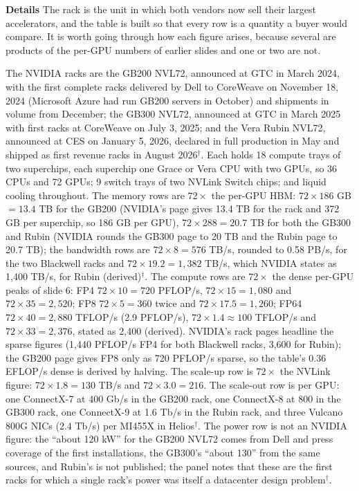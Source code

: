 \documentclass[11pt,letterpaper]{article}
\newcommand{\para}[1]{\medskip\noindent\textbf{#1}\quad}
\begin{document}
\para{Details} The rack is the unit in which both vendors now sell their largest accelerators, and the table is built so that every row is a quantity a buyer would compare. It is worth going through how each figure arises, because several are products of the per-GPU numbers of earlier slides and one or two are not.

The NVIDIA racks are the GB200 NVL72, announced at GTC in March 2024, with the first complete racks delivered by Dell to CoreWeave on November 18, 2024 (Microsoft Azure had run GB200 servers in October) and shipments in volume from December; the GB300 NVL72, announced at GTC in March 2025 with first racks at CoreWeave on July 3, 2025; and the Vera Rubin NVL72, announced at CES on January 5, 2026, declared in full production in May and shipped as first revenue racks in August 2026$^\dagger$. Each holds 18 compute trays of two superchips, each superchip one Grace or Vera CPU with two GPUs, so 36 CPUs and 72 GPUs; 9 switch trays of two NVLink Switch chips; and liquid cooling throughout. The memory rows are $72\times$ the per-GPU HBM: $72 \times 186$ GB $= 13.4$ TB for the GB200 (NVIDIA's page gives 13.4 TB for the rack and 372 GB per superchip, so 186 GB per GPU), $72 \times 288 = 20.7$ TB for both the GB300 and Rubin (NVIDIA rounds the GB300 page to 20 TB and the Rubin page to 20.7 TB); the bandwidth rows are $72 \times 8 = 576$ TB/s, rounded to 0.58 PB/s, for the two Blackwell racks and $72 \times 19.2 = 1{,}382$ TB/s, which NVIDIA states as 1{,}400 TB/s, for Rubin (derived)$^\dagger$. The compute rows are $72\times$ the dense per-GPU peaks of slide 6: FP4 $72 \times 10 = 720$ PFLOP/s, $72 \times 15 = 1{,}080$ and $72 \times 35 = 2{,}520$; FP8 $72 \times 5 = 360$ twice and $72 \times 17.5 = 1{,}260$; FP64 $72 \times 40 = 2{,}880$ TFLOP/s (2.9 PFLOP/s), $72 \times 1.4 \approx 100$ TFLOP/s and $72 \times 33 = 2{,}376$, stated as 2{,}400 (derived). NVIDIA's rack pages headline the sparse figures (1{,}440 PFLOP/s FP4 for both Blackwell racks, 3{,}600 for Rubin); the GB200 page gives FP8 only as 720 PFLOP/s sparse, so the table's 0.36 EFLOP/s dense is derived by halving. The scale-up row is $72\times$ the NVLink figure: $72 \times 1.8 = 130$ TB/s and $72 \times 3.0 = 216$. The scale-out row is per GPU: one ConnectX-7 at 400 Gb/s in the GB200 rack, one ConnectX-8 at 800 in the GB300 rack, one ConnectX-9 at 1.6 Tb/s in the Rubin rack, and three Vulcano 800G NICs (2.4 Tb/s) per MI455X in Helios$^\dagger$. The power row is not an NVIDIA figure: the ``about 120 kW'' for the GB200 NVL72 comes from Dell and press coverage of the first installations, the GB300's ``about 130'' from the same sources, and Rubin's is not published; the panel notes that these are the first racks for which a single rack's power was itself a datacenter design problem$^\dagger$.
\end{document}
